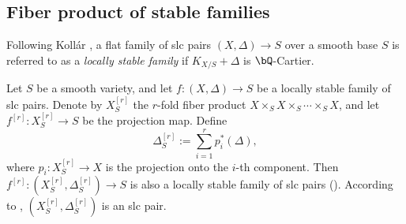 \documentclass[11pt,letterpaper]{amsart}
\numberwithin{equation}{section}
\begin{document}
	\subsection{Fiber product of stable families}
	Following Koll\'ar \cite{Kollar2023}, a flat family of slc pairs $(X, \Delta) \to S$ over a smooth base $S$ is referred to as a \emph{locally stable family} if $K_{X/S} + \Delta$ is $\bQ$-Cartier.
	
	Let $S$ be a smooth variety, and let $f:(X, \Delta) \to S$ be a locally stable family of slc pairs. Denote by $X^{[r]}_S$ the $r$-fold fiber product $X \times_S X \times_S \cdots \times_S X$, and let $f^{[r]}: X^{[r]}_S \to S$ be the projection map. Define  
	$$
	\Delta^{[r]}_S := \sum_{i=1}^r p_i^\ast(\Delta),
	$$  
	where $p_i: X^{[r]}_S \to X$ is the projection onto the $i$-th component. Then $f^{[r]}:(X^{[r]}_S, \Delta^{[r]}_S) \to S$ is also a locally stable family of slc pairs (\cite[Corollary 4.3]{WeiWu2023}). According to \cite[Theorem 4.54]{Kollar2023}, $(X^{[r]}_S, \Delta^{[r]}_S)$ is an slc pair.
	
\end{document}
